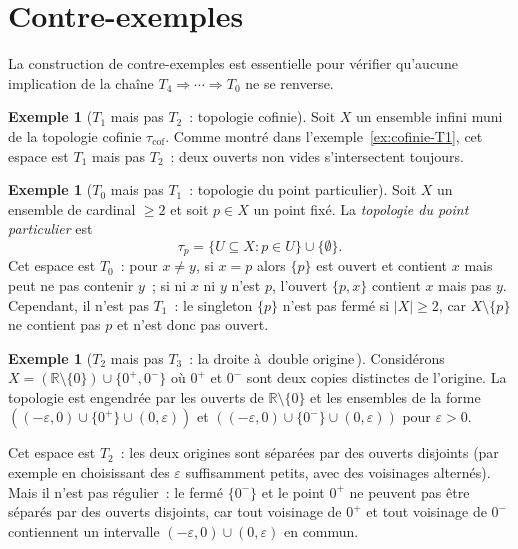 \documentclass[12pt,a4paper,openany]{book}
\theoremstyle{definition}
\theoremstyle{cours}
\theoremstyle{coursnormal}
\newtheorem{exemple}[theoreme]{Exemple}
\newcommand{\R}{\mathbb{R}}
\providecommand{\og}{\guillemotleft\,}
\providecommand{\fg}{\,\guillemotright}
\begin{document}
\section{Contre-exemples}\label{sec:contre-exemples-separation}

La construction de contre-exemples est essentielle pour vérifier qu'aucune
implication de la chaîne $T_4\Rightarrow\cdots\Rightarrow T_0$ ne se renverse.

\begin{exemple}[$T_1$ mais pas $T_2$~: topologie cofinie]\label{ex:cofinie-pas-T2}
  Soit $X$ un ensemble infini muni de la topologie cofinie $\tau_{\mathrm{cof}}$. Comme montré dans
  l'exemple~\ref{ex:cofinie-T1}, cet espace est $T_1$ mais pas $T_2$~: deux
  ouverts non vides s'intersectent toujours.
\end{exemple}

\begin{exemple}[$T_0$ mais pas $T_1$~: topologie du point
  particulier]\label{ex:point-particulier}
  Soit $X$ un ensemble de cardinal $\geq 2$ et soit $p\in X$ un point
  fixé. La \emph{topologie du point
  particulier} est
  \[
    \tau_p = \{U\subseteq X : p\in U\}\cup\{\emptyset\}.
  \]
  Cet espace est $T_0$~: pour $x\neq y$, si $x=p$ alors $\{p\}$ est ouvert et
  contient $x$ mais peut ne pas contenir $y$~; si ni $x$ ni $y$ n'est $p$,
  l'ouvert $\{p,x\}$ contient $x$ mais pas $y$. Cependant, il n'est pas $T_1$~:
  le singleton $\{p\}$ n'est pas fermé si $|X|\geq 2$, car
  $X\setminus\{p\}$ ne contient pas $p$ et n'est donc pas ouvert.
\end{exemple}

\begin{exemple}[$T_2$ mais pas $T_3$~: la droite à \og double origine\fg{}]\label{ex:double-origine}
  Considérons $X = (\R\setminus\{0\})\cup\{0^+,0^-\}$ où $0^+$ et $0^-$ sont deux copies distinctes de l'origine. La
  topologie est engendrée par les ouverts de $\R\setminus\{0\}$ et les
  ensembles de la forme $((-\varepsilon,0)\cup\{0^+\}\cup(0,\varepsilon))$ et
  $((-\varepsilon,0)\cup\{0^-\}\cup(0,\varepsilon))$ pour $\varepsilon>0$.

  Cet espace est $T_2$~: les deux origines sont séparées par
  des ouverts disjoints (par exemple en choisissant des $\varepsilon$
  suffisamment petits, avec des voisinages alternés). Mais il n'est pas
  régulier~: le fermé $\{0^-\}$ et le point $0^+$ ne peuvent pas être séparés
  par des ouverts disjoints, car tout voisinage de $0^+$ et tout voisinage de
  $0^-$ contiennent un intervalle $(-\varepsilon,0)\cup(0,\varepsilon)$ en commun.
\end{exemple}
\end{document}
